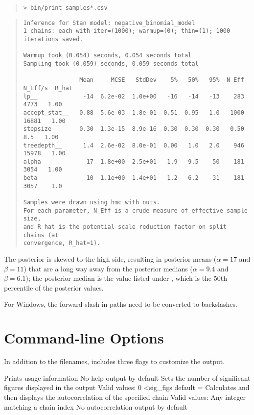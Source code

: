 \begin{quote}
\begin{Verbatim}[fontsize=\small]
> bin/print samples*.csv
\end{Verbatim}
\end{quote}
%
\begin{landscape}
\begin{quote}
{ \footnotesize
\begin{Verbatim}[fontshape=sl,fontsize=\small]
Inference for Stan model: negative_binomial_model
1 chains: each with iter=(1000); warmup=(0); thin=(1); 1000 iterations saved.

Warmup took (0.054) seconds, 0.054 seconds total
Sampling took (0.059) seconds, 0.059 seconds total

                Mean     MCSE   StdDev    5%   50%   95%  N_Eff  N_Eff/s  R_hat
lp__             -14  6.2e-02  1.0e+00   -16   -14   -13    283     4773   1.00
accept_stat__   0.88  5.6e-03  1.8e-01  0.51  0.95   1.0   1000    16881   1.00
stepsize__      0.30  1.3e-15  8.9e-16  0.30  0.30  0.30   0.50      8.5   1.00
treedepth__      1.4  2.6e-02  8.0e-01  0.00   1.0   2.0    946    15978   1.00
alpha             17  1.8e+00  2.5e+01   1.9   9.5    50    181     3054   1.00
beta              10  1.1e+00  1.4e+01   1.2   6.2    31    181     3057    1.0

Samples were drawn using hmc with nuts.
For each parameter, N_Eff is a crude measure of effective sample size,
and R_hat is the potential scale reduction factor on split chains (at 
convergence, R_hat=1).
\end{Verbatim}
}
\end{quote}
\end{landscape}
%
The posterior is skewed to the high side, resulting in posterior means
($\alpha=17$ and $\beta=11$) that are a long way away from the posterior
medians ($\alpha=9.4$ and $\beta=6.1$);  the posterior median is the
value listed under , which is the 50th percentile of the
posterior values.

For Windows, the forward slash in paths need to be converted to backslashes.

\section{Command-line Options}

In addition to the filenames,  includes three flags to customize the output.  

\begin{description}
{Prints usage information}
{No help output by default}
%
{Sets the number of significant figures displayed in the output}
{Valid values: 0 \textless sig\_figs}
{default =  }
%
{Calculates and then displays the autocorrelation of the specified chain}
{Valid values: Any integer matching a chain index}
{No autocorrelation output by default}
%
\end{description}

